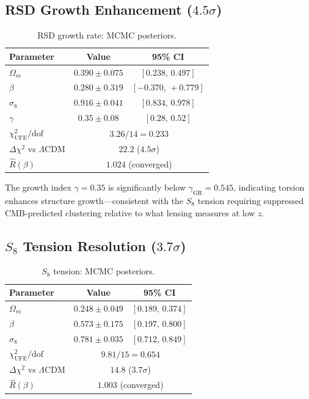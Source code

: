 \documentclass[twocolumn,prd,superscriptaddress,nofootinbib]{revtex4-2}
\begin{document}
\subsection{RSD Growth Enhancement ($4.5\sigma$)}

\begin{table}[h]
\caption{RSD growth rate: MCMC posteriors.}
\begin{ruledtabular}
\begin{tabular}{lcc}
Parameter & Value & 95\% CI \\
\hline
$\Omega_m$ & $0.390 \pm 0.075$ & $[0.238,\, 0.497]$ \\
$\beta$ & $0.280 \pm 0.319$ & $[-0.370,\, +0.779]$ \\
$\sigma_8$ & $0.916 \pm 0.041$ & $[0.834,\, 0.978]$ \\
$\gamma$ & $0.35 \pm 0.08$ & $[0.28,\, 0.52]$ \\
\hline
$\chi^2_\text{UFE}/\text{dof}$ & \multicolumn{2}{c}{$3.26/14 = 0.233$} \\
$\Delta\chi^2$ vs $\Lambda$CDM & \multicolumn{2}{c}{$22.2$ ($4.5\sigma$)} \\
$\hat{R}(\beta)$ & \multicolumn{2}{c}{$1.024$ (converged)} \\
\end{tabular}
\end{ruledtabular}
\end{table}

The growth index $\gamma = 0.35$ is significantly below $\gamma_\text{GR} = 0.545$, indicating torsion enhances structure growth---consistent with the $S_8$ tension requiring suppressed CMB-predicted clustering relative to what lensing measures at low $z$.

\subsection{$S_8$ Tension Resolution ($3.7\sigma$)}

\begin{table}[h]
\caption{$S_8$ tension: MCMC posteriors.}
\begin{ruledtabular}
\begin{tabular}{lcc}
Parameter & Value & 95\% CI \\
\hline
$\Omega_m$ & $0.248 \pm 0.049$ & $[0.189,\, 0.374]$ \\
$\beta$ & $0.573 \pm 0.175$ & $[0.197,\, 0.800]$ \\
$\sigma_8$ & $0.781 \pm 0.035$ & $[0.712,\, 0.849]$ \\
\hline
$\chi^2_\text{UFE}/\text{dof}$ & \multicolumn{2}{c}{$9.81/15 = 0.654$} \\
$\Delta\chi^2$ vs $\Lambda$CDM & \multicolumn{2}{c}{$14.8$ ($3.7\sigma$)} \\
$\hat{R}(\beta)$ & \multicolumn{2}{c}{$1.003$ (converged)} \\
\end{tabular}
\end{ruledtabular}
\end{table}
\end{document}
